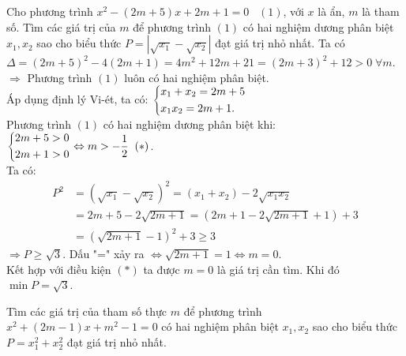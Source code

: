 \begin{ex}%
	
	Cho phương trình $x^2-\left(2m+5\right)x+2m+1=0\;\;\; (1)$, với $x$ là ẩn, $m$ là tham số. Tìm các giá trị của $m$ để phương trình $(1)$ có hai nghiệm dương phân biệt $x_1,x_2$ sao cho biểu thức $P=\left|\sqrt{x_1}-\sqrt{x_2}\right|$ đạt giá trị nhỏ nhất.
	\loigiai
	{Ta có $\Delta = \left(2m+5\right)^2-4\left(2m+1\right)=4m^2+12m+21=\left(2m+3\right)^2+12>0\; \forall m$.\\
		$\Rightarrow $ Phương trình $(1)$ luôn có hai nghiệm phân biệt.\\
		Áp dụng định lý Vi-ét, ta có: $\left\{\begin{aligned}&x_1+x_2=2m+5\\&x_1x_2=2m+1.\end{aligned}\right.$\\
		Phương trình $(1)$ có hai nghiệm dương phân biệt khi: $\left\{\begin{aligned}&2m+5>0\\&2m+1>0\end{aligned}\right.\Leftrightarrow m>-\dfrac{1}{2}\;\;(*)$.\\
		Ta có:
		\begin{align*}
		P^2&=\left(\sqrt{x_1}-\sqrt{x_2}\right)^2=\left(x_1+x_2\right)-2\sqrt{x_1x_2}\\&=2m+5-2\sqrt{2m+1}=\left(2m+1-2\sqrt{2m+1}+1\right)+3\\&=\left(\sqrt{2m+1}-1\right)^2+3\ge 3
		\end{align*}
		$\Rightarrow P\ge \sqrt{3}$. Dấu "=" xảy ra $\Leftrightarrow \sqrt{2m+1}=1\Leftrightarrow m=0$.\\
		Kết hợp với điều kiện $(*)$ ta được $m=0$ là giá trị cần tìm. Khi đó $\min P=\sqrt{3}$.
	}
\end{ex}
\begin{ex}%
	Tìm các giá trị của tham số thực $m$ để phương trình $x^2+(2m-1)x+m^2-1=0$ có hai nghiệm phân biệt $x_1,x_2$ sao cho biểu thức $P=x_1^2+x_2^2$ đạt giá trị nhỏ nhất.
\end{ex}

